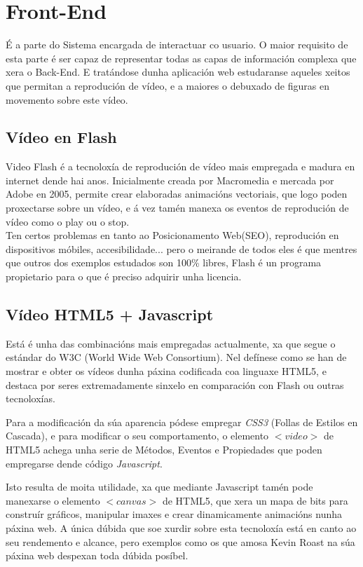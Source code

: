 	
\section{Front-End}
	É a parte do Sistema encargada de interactuar co usuario. O maior requisito de esta 
	parte é ser capaz de representar todas as capas de información complexa que xera o
	Back-End. E tratándose dunha aplicación web estudaranse aqueles xeitos que permitan
	a reprodución de vídeo, e a maiores o debuxado de figuras en movemento sobre este vídeo.
	
	\subsection{Vídeo en Flash}
		Video Flash é a tecnoloxía de reprodución de vídeo mais empregada e madura en
		internet dende hai anos. Inicialmente creada por Macromedia e mercada por Adobe 
		en 2005, permite crear elaboradas animacións vectoriais, que logo poden proxectarse
		sobre un vídeo, e á vez tamén manexa os eventos de reprodución de vídeo como o 
		play ou o stop.\\
		
		Ten certos problemas en tanto ao Posicionamento Web(SEO), reprodución en 
		dispositivos móbiles, accesibilidade... pero o meirande de todos eles é que mentres
		que outros dos exemplos estudados son 100\% libres, Flash é un programa propietario
		para o que é preciso adquirir unha licencia.		
		
	
	\subsection{Vídeo HTML5 + Javascript}
		Está é unha das combinacións mais empregadas actualmente, xa que segue o estándar
		do W3C (World Wide Web Consortium)\cite{w3schools-video-tag}. Nel defínese como se
		han de mostrar e obter os vídeos dunha páxina codificada coa linguaxe HTML5, e 
		destaca por seres extremadamente sinxelo en comparación con Flash ou outras tecnoloxías.
		
		Para a modificación da súa aparencia pódese empregar \emph{CSS3} (Follas de Estilos en 
		Cascada), e para modificar o seu comportamento, o elemento $<video>$ de HTML5 achega
		unha serie de Métodos, Eventos e Propiedades\cite{w3school-video-events} que poden
		empregarse dende código \emph{Javascript}.
		
		Isto resulta de moita utilidade, xa que mediante Javascript tamén pode manexarse o
		elemento $<canvas>$ de HTML5, que xera un mapa de bits para construír gráficos, 
		manipular imaxes e crear dinamicamente animacións nunha páxina web. A única dúbida que
		soe xurdir sobre esta tecnoloxía está en canto ao seu rendemento e alcance, pero
		exemplos como os que amosa Kevin Roast na súa páxina web\cite{kevin-roast-canvas-examples}
		despexan toda dúbida posíbel. 
		
